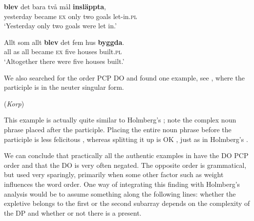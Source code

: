 \documentclass[output=paper]{LSP/langsci}
\begin{document}
\ex \label{ex:engdahl:11b}
    \textbf{blev}  det bara två     mål     \textbf{insläppta},    \\
    yesterday  became \textsc{ex} only two goals  let-in.\textsc{pl}\\
    \glt ‘Yesterday only two goals were let in.'

\ex \label{ex:engdahl:11c}
\gll Allt som allt   \textbf{blev}  det   fem     hus     \textbf{byggda}.  \\
     all    as  all    became \textsc{ex}    five  houses    built\textsc{.pl}\\
    \glt ‘Altogether there were five houses built.’
\z
\z

\noindent We also searched for the order PCP DO and found one example, see , where the participle is in the neuter singular form.

\ea%
    \label{ex:engdahl:12}
     (\textit{Korp})
   

\z
\z

\noindent This example is actually quite similar to Holmberg’s ; note the complex noun phrase placed after the participle. Placing the entire noun phrase before the participle is less felicitous , whereas splitting it up is OK , just as in Holmberg’s .

We can conclude that practically all the authentic examples in  have the DO PCP order and that the DO is very often negated. The opposite order is grammatical, but used very sparingly, primarily when some other factor such as weight influences the word order. One way of integrating this finding with Holmberg’s analysis would be to assume something along the following lines: whether the expletive belongs to the first or the second subarray depends on the complexity of the DP and whether or not there is a  present.
\end{document}
